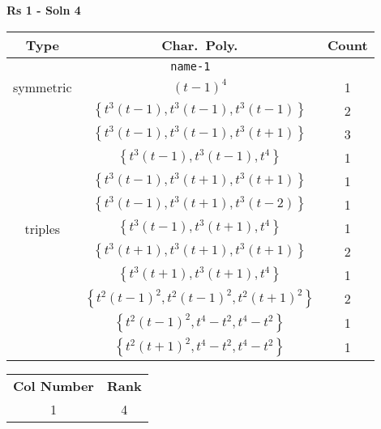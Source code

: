 \documentclass{article}
\begin{document}
    
    \textbf{Rs 1 - Soln 4}
    \begin{table}
    \begin{tabular}{|c|c|c|}
    \hline
    \textbf{Type} & \textbf{Char.~Poly.} & \textbf{Count} \\
    \hline \multicolumn{3}{|c|}{\texttt{name-1}} \\ \hline
    \multirow{1}{*}{symmetric}
     & $(t - 1)^4$ & 1 \\
    \hline
    \multirow{11}{*}{triples}
     & $\left\{t^3(t - 1),t^3(t - 1),t^3(t - 1)\right\}$ & 2 \\
     & $\left\{t^3(t - 1),t^3(t - 1),t^3(t + 1)\right\}$ & 3 \\
     & $\left\{t^3(t - 1),t^3(t - 1),t^4\right\}$ & 1 \\
     & $\left\{t^3(t - 1),t^3(t + 1),t^3(t + 1)\right\}$ & 1 \\
     & $\left\{t^3(t - 1),t^3(t + 1),t^3(t - 2)\right\}$ & 1 \\
     & $\left\{t^3(t - 1),t^3(t + 1),t^4\right\}$ & 1 \\
     & $\left\{t^3(t + 1),t^3(t + 1),t^3(t + 1)\right\}$ & 2 \\
     & $\left\{t^3(t + 1),t^3(t + 1),t^4\right\}$ & 1 \\
     & $\left\{t^2(t - 1)^2,t^2(t - 1)^2,t^2(t + 1)^2\right\}$ & 2 \\
     & $\left\{t^2(t - 1)^2,t^4 - t^2,t^4 - t^2\right\}$ & 1 \\
     & $\left\{t^2(t + 1)^2,t^4 - t^2,t^4 - t^2\right\}$ & 1 \\
    \hline
    \end{tabular}
    \end{table}
    \begin{table}
    \begin{tabular}{|c|c|}
    \hline
    \textbf{Col Number} & \textbf{Rank}\\
    1 & 4 \\ 
    \hline
    \end{tabular}
    \end{table}
    \newpage
    
\end{document}

